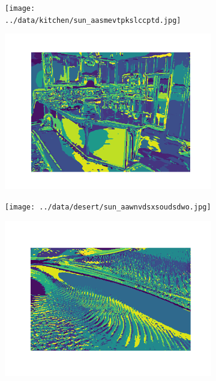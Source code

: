 \documentclass{article} %
\begin{document}
    \begin{figure}[h]
        \begin{subfigure}[b]{0.5\textwidth}
            \texttt{[image: ../data/kitchen/sun\_aasmevtpkslccptd.jpg]}
        \end{subfigure}
        \begin{subfigure}[b]{0.5\textwidth}
            \includegraphics[width=\textwidth]{q1,3_1.png}
        \end{subfigure}
        \begin{subfigure}[b]{0.5\textwidth}
            \texttt{[image: ../data/desert/sun\_aawnvdsxsoudsdwo.jpg]}
        \end{subfigure}
        \begin{subfigure}[b]{0.5\textwidth}
            \includegraphics[width=\textwidth]{q1,3_2.png}

\end{subfigure}
\end{figure}
\end{document}
